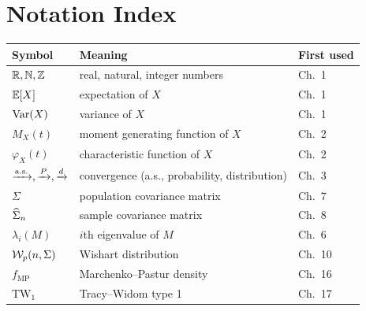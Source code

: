 \chapter{Notation Index}
\label{app:notation}


\bigskip
\noindent
\begin{tabular}{@{}lll@{}}
  \toprule
  \textbf{Symbol} & \textbf{Meaning} & \textbf{First used} \\
  \midrule
  $\mathbb{R}, \mathbb{N}, \mathbb{Z}$ & real, natural, integer numbers & Ch.\ 1 \\
  $\mathbb{E}[X]$ & expectation of $X$ & Ch.\ 1 \\
  $\mathrm{Var}(X)$ & variance of $X$ & Ch.\ 1 \\
  $M_X(t)$ & moment generating function of $X$ & Ch.\ 2 \\
  $\varphi_X(t)$ & characteristic function of $X$ & Ch.\ 2 \\
  $\xrightarrow{\mathrm{a.s.}}, \xrightarrow{P}, \xrightarrow{d}$ & convergence (a.s., probability, distribution) & Ch.\ 3 \\
  $\Sigma$ & population covariance matrix & Ch.\ 7 \\
  $\widehat{\Sigma}_n$ & sample covariance matrix & Ch.\ 8 \\
  $\lambda_i(M)$ & $i$th eigenvalue of $M$ & Ch.\ 6 \\
  $\mathcal{W}_p(n, \Sigma)$ & Wishart distribution & Ch.\ 10 \\
  $f_{\mathrm{MP}}$ & Marchenko--Pastur density & Ch.\ 16 \\
  $\mathrm{TW}_1$ & Tracy--Widom type 1 & Ch.\ 17 \\
  \bottomrule
\end{tabular}

